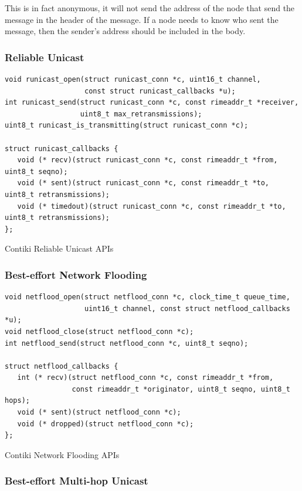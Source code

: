This is in fact anonymous, it will not send the address of the node that send the message in the header of the message. If a node needs to know who sent the message, then the sender's address should be included in the body.

\subsubsection{Reliable Unicast}

\begin{listing}[H]
\begin{verbatim}
void runicast_open(struct runicast_conn *c, uint16_t channel,
                   const struct runicast_callbacks *u);
int runicast_send(struct runicast_conn *c, const rimeaddr_t *receiver,
                  uint8_t max_retransmissions);
uint8_t runicast_is_transmitting(struct runicast_conn *c);

struct runicast_callbacks {
   void (* recv)(struct runicast_conn *c, const rimeaddr_t *from, uint8_t seqno);
   void (* sent)(struct runicast_conn *c, const rimeaddr_t *to, uint8_t retransmissions);
   void (* timedout)(struct runicast_conn *c, const rimeaddr_t *to, uint8_t retransmissions);
};
\end{verbatim}
\caption{Contiki Reliable Unicast APIs}
\end{listing}

\subsubsection{Best-effort Network Flooding}

\begin{listing}[H]
\begin{verbatim}
void netflood_open(struct netflood_conn *c, clock_time_t queue_time,
                   uint16_t channel, const struct netflood_callbacks *u);
void netflood_close(struct netflood_conn *c);
int netflood_send(struct netflood_conn *c, uint8_t seqno);

struct netflood_callbacks {
   int (* recv)(struct netflood_conn *c, const rimeaddr_t *from,
                const rimeaddr_t *originator, uint8_t seqno, uint8_t hops);
   void (* sent)(struct netflood_conn *c);
   void (* dropped)(struct netflood_conn *c);
};
\end{verbatim}
\caption{Contiki Network Flooding APIs}
\end{listing}

\subsubsection{Best-effort Multi-hop Unicast}

